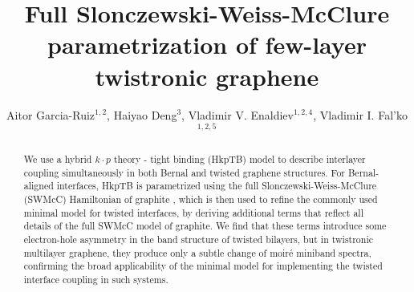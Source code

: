 \documentclass[showpacs,aps,prb,reprint,twocolumn]{revtex4-1}
\begin{document}

\title{Full Slonczewski-Weiss-McClure parametrization of few-layer twistronic graphene}
\author{Aitor Garcia-Ruiz$^{1,2}$, Haiyao Deng${}^{3}$, Vladimir V. Enaldiev${}^{1,2,4}$, Vladimir I. Fal'ko${}^{1,2,5}$}
\begin{abstract}
We use a hybrid $k \cdot p$ theory - tight binding (HkpTB) model to describe interlayer coupling simultaneously in both Bernal and twisted graphene structures. For Bernal-aligned interfaces, HkpTB is parametrized using the full Slonczewski-Weiss-McClure (SWMcC) Hamiltonian of graphite \cite{McCann_2013}, which is then used to refine the commonly used minimal model for twisted interfaces\cite{Lopes_2007, Bistritzer_2011}, by deriving additional terms that reflect all details of the full SWMcC model of graphite. We find that these terms introduce some electron-hole asymmetry in the band structure of twisted bilayers, but in twistronic multilayer graphene, they produce only a subtle change of moir\'{e} miniband spectra, confirming the broad applicability of the minimal model for implementing the twisted interface coupling in such systems.

\end{abstract}

\maketitle
\end{document}
